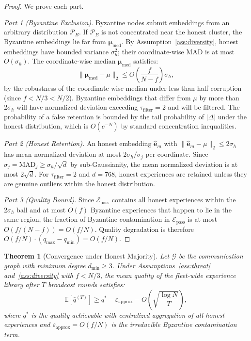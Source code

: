 \documentclass[11pt]{article}
\newtheorem{theorem}{Theorem}
\DeclareMathOperator{\med}{med}
\begin{document}
\begin{proof}
We prove each part.

\textit{Part 1 (Byzantine Exclusion).}
Byzantine nodes submit embeddings from an arbitrary distribution $\mathcal{P}_B$.
If $\mathcal{P}_B$ is not concentrated near the honest cluster, the Byzantine
embeddings lie far from $\bm{\mu}_{\med}$. By Assumption~\ref{ass:diversity},
honest embeddings have bounded variance $\sigma_h^2$; their coordinate-wise MAD
is at most $O(\sigma_h)$. The coordinate-wise median $\bm{\mu}_{\med}$ satisfies:
\begin{equation}
    \|\bm{\mu}_{\med} - \mu\|_2 \leq O\left(\frac{f}{N-f}\right) \sigma_h,
\end{equation}
by the robustness of the coordinate-wise median under less-than-half corruption
(since $f < N/3 < N/2$). Byzantine embeddings that differ from $\mu$ by more
than $2\sigma_h$ will have normalized deviation exceeding $\tau_{\text{filter}} = 2$
and will be filtered. The probability of a false retention is bounded by
the tail probability of $|\Delta|$ under the honest distribution, which is
$O(e^{-N})$ by standard concentration inequalities.

\textit{Part 2 (Honest Retention).}
An honest embedding $\hat{\bm{e}}_m$ with $\|\hat{\bm{e}}_m - \mu\|_2 \leq
2\sigma_h$ has mean normalized deviation at most $2\sigma_h / \sigma_j$ per
coordinate. Since $\sigma_j = \text{MAD}_j \geq \sigma_h / \sqrt{d}$ by
sub-Gaussianity, the mean normalized deviation is at most $2\sqrt{d}$.
For $\tau_{\text{filter}} = 2$ and $d = 768$, honest experiences are retained
unless they are genuine outliers within the honest distribution.

\textit{Part 3 (Quality Bound).}
Since $\mathcal{E}_{\text{pass}}$ contains all honest experiences within the
$2\sigma_h$ ball and at most $O(f)$ Byzantine experiences that happen to lie
in the same region, the fraction of Byzantine contamination in $\mathcal{E}_{\text{pass}}$
is at most $O(f / (N - f)) = O(f/N)$. Quality degradation is therefore
$O(f/N) \cdot (q_{\max} - q_{\min}) = O(f/N)$.
\end{proof}

\begin{theorem}[Convergence under Honest Majority]
\label{thm:convergence-ds}
Let $\mathcal{G}$ be the communication graph with minimum degree
$d_{\min} \geq 3$. Under Assumptions~\ref{ass:threat} and~\ref{ass:diversity}
with $f < N/3$, the mean quality of the fleet-wide experience library after
$T$ broadcast rounds satisfies:
\begin{equation}
    \mathbb{E}\left[\bar{q}^{(T)}\right] \geq q^*
    - \varepsilon_{\text{approx}} - O\left(\sqrt{\frac{\log N}{T}}\right),
    \label{eq:convergence-ds}
\end{equation}
where $q^*$ is the quality achievable with centralized aggregation of all
honest experiences and $\varepsilon_{\text{approx}} = O(f/N)$ is the
irreducible Byzantine contamination term.
\end{theorem}
\end{document}
